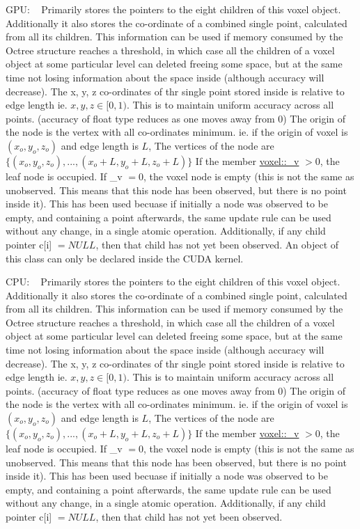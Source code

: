 G\+PU\+: ~\newline
 Primarily stores the pointers to the eight children of this voxel object. Additionally it also stores the co-\/ordinate of a combined single point, calculated from all its children. This information can be used if memory consumed by the Octree structure reaches a threshold, in which case all the children of a voxel object at some particular level can deleted freeing some space, but at the same time not losing information about the space inside (although accuracy will decrease). The x, y, z co-\/ordinates of thr single point stored inside is relative to edge length ie. $x, y, z \in [0,1)$. This is to maintain uniform accuracy across all points. (accuracy of float type reduces as one moves away from 0) The origin of the node is the vertex with all co-\/ordinates minimum. ie. if the origin of voxel is $(x_o, y_o, z_o)$ and edge length is $L$, The vertices of the node are $\{(x_o, y_o, z_o), ..., (x_o+L, y_o+L, z_o+L)\}$ If the member \hyperlink{classvoxel_a01aebb82be393552c039c11a2c168845}{voxel\+::\+\_\+v} $> 0$, the leaf node is occupied. If \+\_\+v $= 0$, the voxel node is empty (this is not the same as unobserved. This means that this node has been observed, but there is no point inside it). This has been used becuase if initially a node was observed to be empty, and containing a point afterwards, the same update rule can be used without any change, in a single atomic operation. Additionally, if any child pointer c\mbox{[}i\mbox{]} $= NULL$, then that child has not yet been observed. An object of this class can only be declared inside the C\+U\+DA kernel.

C\+PU\+: ~\newline
 Primarily stores the pointers to the eight children of this voxel object. Additionally it also stores the co-\/ordinate of a combined single point, calculated from all its children. This information can be used if memory consumed by the Octree structure reaches a threshold, in which case all the children of a voxel object at some particular level can deleted freeing some space, but at the same time not losing information about the space inside (although accuracy will decrease). The x, y, z co-\/ordinates of thr single point stored inside is relative to edge length ie. $x, y, z \in [0,1)$. This is to maintain uniform accuracy across all points. (accuracy of float type reduces as one moves away from 0) The origin of the node is the vertex with all co-\/ordinates minimum. ie. if the origin of voxel is $(x_o, y_o, z_o)$ and edge length is $L$, The vertices of the node are $\{(x_o, y_o, z_o), ..., (x_o+L, y_o+L, z_o+L)\}$ If the member \hyperlink{classvoxel_a01aebb82be393552c039c11a2c168845}{voxel\+::\+\_\+v} $> 0$, the leaf node is occupied. If \+\_\+v $= 0$, the voxel node is empty (this is not the same as unobserved. This means that this node has been observed, but there is no point inside it). This has been used becuase if initially a node was observed to be empty, and containing a point afterwards, the same update rule can be used without any change, in a single atomic operation. Additionally, if any child pointer c\mbox{[}i\mbox{]} $= NULL$, then that child has not yet been observed. 

